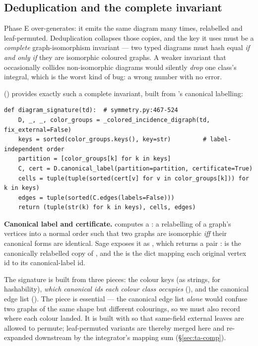 \subsection{Deduplication and the complete invariant}\label{sec:ta-dedup}

Phase E over-generates: it emits the same diagram many times, relabelled and
leaf-permuted. Deduplication collapses those copies, and the key it uses must be
a \emph{complete} graph-isomorphism invariant --- two typed diagrams must hash
equal \emph{if and only if} they are isomorphic coloured graphs. A weaker
invariant that occasionally collides non-isomorphic diagrams would silently
\emph{drop} one class's integral, which is the worst kind of bug: a wrong number
with no error.

 () provides exactly such
a complete invariant, built from 's canonical labelling:

\begin{lstlisting}
def diagram_signature(td):  # symmetry.py:467-524
    D, _, _, color_groups = _colored_incidence_digraph(td, fix_external=False)
    keys = sorted(color_groups.keys(), key=str)         # label-independent order
    partition = [color_groups[k] for k in keys]
    C, cert = D.canonical_label(partition=partition, certificate=True)
    cells = tuple(tuple(sorted(cert[v] for v in color_groups[k])) for k in keys)
    edges = tuple(sorted(C.edges(labels=False)))
    return (tuple(str(k) for k in keys), cells, edges)
\end{lstlisting}

\begin{defn}
\textbf{Canonical label and certificate.}
 computes a : a relabelling of a graph's
vertices into a normal order such that two graphs are isomorphic \emph{iff} their
canonical forms are identical. Sage exposes it as
, which returns a pair
:  is the canonically relabelled copy of , and the
  is the dict mapping each original vertex id to its
canonical-label id.
\end{defn}

The signature is built from three pieces: the colour keys (as strings, for
hashability), \emph{which canonical ids each colour class occupies}
(), and the canonical edge list (). The  piece
is essential --- the canonical edge list \emph{alone} would confuse two graphs of
the same shape but different colourings, so we must also record where each colour
landed. It is built with  so that same-field external
leaves are allowed to permute; leaf-permuted variants are thereby merged here and
re-expanded downstream by the integrator's mapping sum (\S\ref{sec:ta-comp}).

